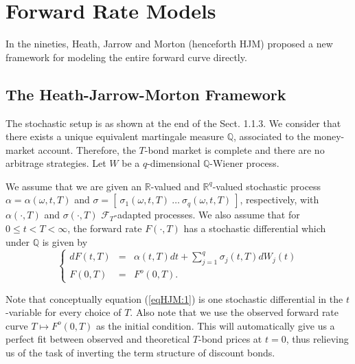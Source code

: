 %
\chapter{Forward Rate Models}
In the nineties, Heath, Jarrow and Morton (henceforth HJM)
\cite{HJM:1992} proposed a new framework for modeling the entire
forward curve directly.
\section{The Heath-Jarrow-Morton Framework}   
The stochastic setup is as shown at the end of the Sect. 1.1.3. We
consider that there exists a unique equivalent martingale
measure $\mathbb{Q}$, associated to the money-market
account. Therefore, the $T$-bond market is complete and there are no 
arbitrage strategies. Let $W$ be a $q$-dimensional $\mathbb{Q}$-Wiener
process. 

We assume that we are given an $\mathbb{R}$-valued and
$\mathbb{R}^q$-valued stochastic process $\alpha=\alpha(\omega, t, T)$ 
and $\sigma=[~\sigma_1(\omega,t,T)~\dots~\sigma_q(\omega,t,T)~]$,
respectively, with $\alpha(\cdot,T)$ and $\sigma(\cdot,T)$
$\mathcal{F}_T$-adapted processes. We also assume that for $0\leq
t<T<\infty$, the forward rate $F(\cdot,T)$ has a stochastic
differential which under $\mathbb{Q}$ is given by
\begin{equation}
\label{eqHJM:1}
\left\{
\begin{array}{rcl}
dF(t,T)& = & \alpha(t,T) dt + \displaystyle \sum_{j=1}^q
\sigma_j(t,T)dW_j (t) \\ 
F(0,T) & = & F^o(0,T).
\end{array}
\right.
\end{equation}

Note that conceptually equation (\ref{eqHJM:1}) is one stochastic
differential in the $t$-variable for every choice of $T$. Also note 
that we use the observed forward rate curve $T \mapsto F^o(0,T)$ as
the initial condition. This will automatically give us a perfect fit
between observed and theoretical $T$-bond prices at $t=0$, thus
relieving us of the task of inverting the term structure of discount
bonds. 

